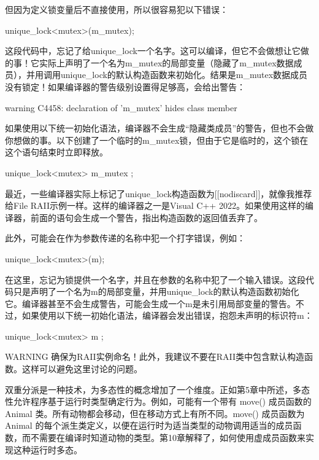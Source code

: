 但因为定义锁变量后不直接使用，所以很容易犯以下错误：

\begin{cpp}
unique_lock<mutex>(m_mutex);
\end{cpp}

这段代码中，忘记了给unique\_lock一个名字。这可以编译，但它不会做想让它做的事！它实际上声明了一个名为m\_mutex的局部变量（隐藏了m\_mutex数据成员），并用调用unique\_lock的默认构造函数来初始化。结果是m\_mutex数据成员没有锁定！如果编译器的警告级别设置得足够高，会给出警告：

\begin{shell}
warning C4458: declaration of 'm_mutex' hides class member
\end{shell}

如果使用以下统一初始化语法，编译器不会生成“隐藏类成员”的警告，但也不会做你想做的事。以下创建了一个临时的m\_mutex锁，但由于它是临时的，这个锁在这个语句结束时立即释放。

\begin{cpp}
unique_lock<mutex> { m_mutex };
\end{cpp}

最近，一些编译器实际上标记了unique\_lock构造函数为[[nodiscard]]，就像我推荐给File RAII示例一样。这样的编译器之一是Visual C++ 2022。如果使用这样的编译器，前面的语句会生成一个警告，指出构造函数的返回值丢弃了。

此外，可能会在作为参数传递的名称中犯一个打字错误，例如：

\begin{cpp}
unique_lock<mutex>(m);
\end{cpp}

在这里，忘记为锁提供一个名字，并且在参数的名称中犯了一个输入错误。这段代码只是声明了一个名为m的局部变量，并用unique\_lock的默认构造函数初始化它。编译器甚至不会生成警告，可能会生成一个m是未引用局部变量的警告。不过，如果使用以下统一初始化语法，编译器会发出错误，抱怨未声明的标识符m：

\begin{cpp}
unique_lock<mutex> { m };
\end{cpp}

\begin{myWarning}{WARNING}
确保为RAII实例命名！此外，我建议不要在RAII类中包含默认构造函数。这样可以避免这里讨论的问题。
\end{myWarning}


双重分派是一种技术，为多态性的概念增加了一个维度。正如第5章中所述，多态性允许程序基于运行时类型确定行为。例如，可能有一个带有 move() 成员函数的 Animal 类。所有动物都会移动，但在移动方式上有所不同。move() 成员函数为 Animal 的每个派生类定义，以便在运行时为适当类型的动物调用适当的成员函数，而不需要在编译时知道动物的类型。第10章解释了，如何使用虚成员函数来实现这种运行时多态。

